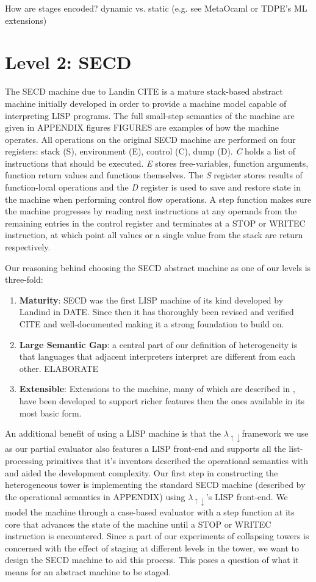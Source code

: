 \documentclass[fleqn]{article}
\theoremstyle{definition}
\newcommand{\mslang}{$\lambda_{\uparrow\downarrow}$}
\begin{document}
How are stages encoded? dynamic vs. static (e.g. see MetaOcaml or TDPE's ML extensions)

\section{Level 2: SECD}
The SECD machine due to Landin CITE is a mature stack-based abstract machine initially developed in order to provide a machine model capable of interpreting LISP programs. The full small-step semantics of the machine are given in APPENDIX figures FIGURES are examples of how the machine operates. All operations on the original SECD machine are performed on four registers: stack (S), environment (E), control (C), dump (D). \textit{C} holds a list of instructions that should be executed. \textit{E} stores free-variables, function arguments, function return values and functions themselves. The \textit{S} register stores results of function-local operations and the \textit{D} register is used to save and restore state in the machine when performing control flow operations. A step function makes sure the machine progresses by reading next instructions at any operands from the remaining entries in the control register and terminates at a STOP or WRITEC instruction, at which point all values or a single value from the stack are return respectively.

Our reasoning behind choosing the SECD abstract machine as one of our levels is three-fold:
\begin{enumerate}
	\item \textbf{Maturity}: SECD was the first LISP machine of its kind developed by Landind in DATE. Since then it has thoroughly been revised and verified CITE and well-documented making it a strong foundation to build on.
	\item \textbf{Large Semantic Gap}: a central part of our definition of heterogeneity is that languages that adjacent interpreters interpret are different from each other. ELABORATE
	\item \textbf{Extensible}: Extensions to the machine, many of which are described in \cite{kogge1990architecture}, have been developed to support richer features then the ones available in its most basic form.
\end{enumerate}
An additional benefit of using a LISP machine is that the \mslang framework we use as our partial evaluator also features a LISP front-end and supports all the list-processing primitives that it's inventors described the operational semantics with and aided the development complexity. Our first step in constructing the heterogeneous tower is implementing the standard SECD machine (described by the operational semantics in APPENDIX) using \mslang's LISP front-end. We model the machine through a case-based evaluator with a step function at its core that advances the state of the machine until a STOP or WRITEC instruction is encountered. Since a part of our experiments of collapsing towers is concerned with the effect of staging at different levels in the tower, we want to design the SECD machine to aid this process. This poses a question of what it means for an abstract machine to be staged.
\end{document}
